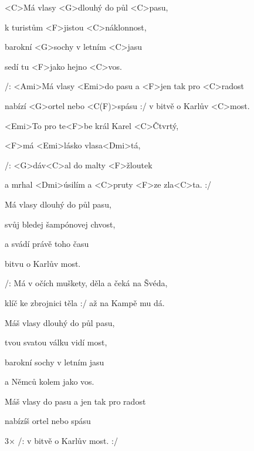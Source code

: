 

\zs
<C>Má vlasy <G>dlouhý do půl <C>pasu,

k turistům <F>jistou <C>náklonnost,

barokní <G>sochy v letním <C>jasu

sedí tu <F>jako hejno <C>vos.

/: <Ami>Má vlasy <Emi>do pasu a <F>jen tak pro <C>radost

nabízí <G>ortel nebo <C(F)>spásu :/ v bitvě o Karlův <C>most.
\ks

\zr
<Emi>To pro te<F>be král Karel <C>Čtvrtý,

<F>má <Emi>lásko vlasa<Dmi>tá,

/: <G>dáv<C>al do malty <F>žloutek

a mrhal <Dmi>úsilím a <C>pruty <F>ze zla<C>ta. :/
\kr

\zs
Má vlasy dlouhý do půl pasu,

svůj bledej šampónovej chvost,

a svádí právě toho času

bitvu o Karlův most.


/: Má v očích muškety, děla a čeká na Švéda,

klíč ke zbrojnici těla :/ až na Kampě mu dá.
\ks


\zr \kr

\zs

Máš vlasy dlouhý do půl pasu,

tvou svatou válku vidí most,

barokní sochy v letním jasu

a Němců kolem jako vos.



Máš vlasy do pasu a jen tak pro radost

nabízíš ortel nebo spásu

3× /: v bitvě o Karlův most. :/
\ks

\kp





